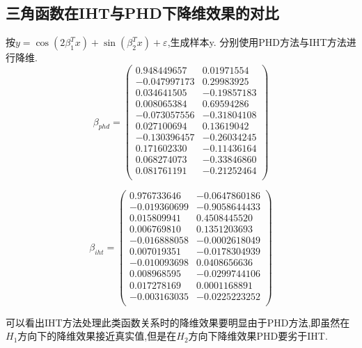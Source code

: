 \subsection{三角函数在IHT与PHD下降维效果的对比}
按$y=\cos(2\beta_1^Tx)+\sin(\beta_2^Tx)+\varepsilon$,生成样本y. 分别使用PHD方法与IHT方法进行降维.
\begin{equation}       %
    \beta_{phd}= \left(                 %
       \begin{array}{cc}   %
          0.948449657  &  0.01971554 \\
         -0.047997173  &  0.29983925 \\
          0.034641505  & -0.19857183 \\
          0.008065384  &  0.69594286 \\
         -0.073057556  & -0.31804108 \\
          0.027100694  &  0.13619042 \\
         -0.130396457  & -0.26034245 \\
          0.171602330  & -0.11436164 \\
          0.068274073  & -0.33846860 \\
          0.081761191  & -0.21252464 \\
       \end{array}
     \right)                 %
 \end{equation}


 \begin{equation}       %
    \beta_{iht}= \left(                 %
       \begin{array}{cc}   %
          0.976733646  & -0.0647860186 \\
         -0.019360699  & -0.9058644433 \\
          0.015809941  &  0.4508445520 \\
          0.006769810  &  0.1351203693 \\
         -0.016888058  & -0.0002618049 \\
          0.007019351  & -0.0178304939 \\
         -0.010093698  &  0.0408656636 \\
          0.008968595  & -0.0299744106 \\
          0.017278169  &  0.0001168891 \\
         -0.003163035  & -0.0225223252 \\
       \end{array}
     \right)                 %
 \end{equation}


可以看出IHT方法处理此类函数关系时的降维效果要明显由于PHD方法,即虽然在$H_1$方向下的降维效果接近真实值,但是在$H_2$方向下降维效果PHD要劣于IHT.